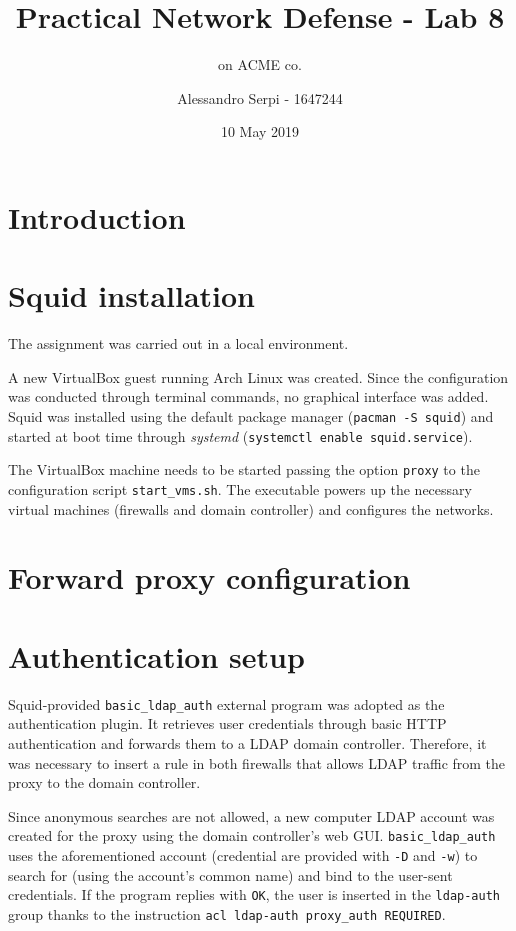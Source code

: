 \documentclass[draft]{homework}
\title{Practical Network Defense - Lab 8}
\subtitle{\sq on ACME co.}
\author{Alessandro Serpi - 1647244}
\date{10 May 2019}
\newcommand{\sq}{Squid\xspace}
\newcommand{\vb}{VirtualBox\xspace}
\begin{document}
    \maketitle
    \tableofcontents
    
    
    \pagebreak
    \section{Introduction}
    
    
    \section{\sq installation}
    The assignment was carried out in a local environment.
    
    A new \vb guest running Arch Linux was created.
    Since the configuration was conducted through terminal commands, no graphical interface was added.
    Squid was installed using the default package manager (\texttt{pacman -S squid}) and started at boot time through \textit{systemd} (\texttt{systemctl enable squid.service}).
    
    The \vb machine needs to be started passing the option \texttt{proxy} to the configuration script \texttt{start\_vms.sh}.
    The executable powers up the necessary virtual machines (firewalls and domain controller) and configures the networks.
    
    
    \section{Forward proxy configuration}
    
    
    \section{Authentication setup}
    \sq-provided \texttt{basic\_ldap\_auth} external program was adopted as the authentication plugin.
    It retrieves user credentials through basic HTTP authentication and forwards them to a LDAP domain controller.
    Therefore, it was necessary to insert a rule in both firewalls that allows LDAP traffic from the proxy to the domain controller.
    
    Since anonymous searches are not allowed, a new computer LDAP account was created for the proxy using the domain controller's web GUI.
    \texttt{basic\_ldap\_auth} uses the aforementioned account (credential are provided with \texttt{-D} and \texttt{-w}) to search for (using the account's common name) and bind to the user-sent credentials.
    If the program replies with \texttt{OK}, the user is inserted in the \texttt{ldap-auth} group thanks to the instruction \texttt{acl ldap-auth proxy_auth REQUIRED}.
    
\end{document}

